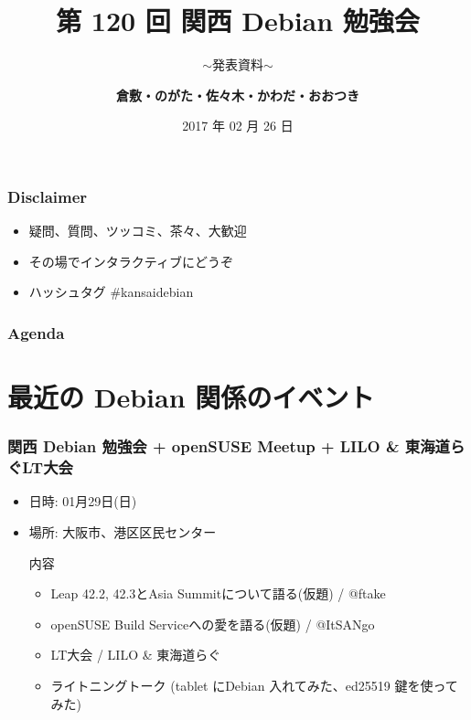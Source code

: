 \documentclass[cjk,dvipdfmx,12pt,compress,%
hyperref={bookmarks=true,bookmarksnumbered=true,bookmarksopen=false,%
colorlinks=false,%
pdftitle={第 120 回 関西 Debian 勉強会},%
pdfauthor={倉敷・のがた・佐々木・かわだ・おおつき},%
pdfsubject={資料},%
}]{beamer}
\title{第 120 回 関西 Debian 勉強会}
\subtitle{$\sim$発表資料$\sim$}
\author[かわだ てつたろう]{{\large\bf 倉敷・のがた・佐々木・かわだ・おおつき}}
\institute[Debian JP]{{\normalsize\tt 関西 Debian 勉強会}}
\date{{\small 2017 年 02 月 26 日}}
\begin{document}
\begin{frame}
\titlepage
\end{frame}

\begin{frame}[fragile]
  \frametitle{Disclaimer}
  \begin{itemize}
  \item 疑問、質問、ツッコミ、茶々、\alert{大歓迎}
  \item その場でインタラクティブにどうぞ
  \item ハッシュタグ \#kansaidebian
  \end{itemize}
\end{frame}


\begin{frame}[fragile]
\frametitle{Agenda}

\tableofcontents

\end{frame}

\section{最近の Debian 関係のイベント}

\begin{frame}[fragile]
  \frametitle{関西 Debian 勉強会 + openSUSE Meetup + LILO \& 東海道らぐLT大会}
  \begin{itemize}
  \item 日時: 01月29日(日)
  \item 場所: 大阪市、港区区民センター
  \begin{block}{内容}
    \begin{itemize}
        \item{Leap 42.2, 42.3とAsia Summitについて語る(仮題) / @ftake}
        \item{openSUSE Build Serviceへの愛を語る(仮題) / @ItSANgo}
        \item{LT大会 / LILO \& 東海道らぐ}
        \item{ライトニングトーク (tablet にDebian 入れてみた、ed25519 鍵を使ってみた) }
    \end{itemize}
  \end{block}
\end{itemize}
\end{frame}
\end{document}
